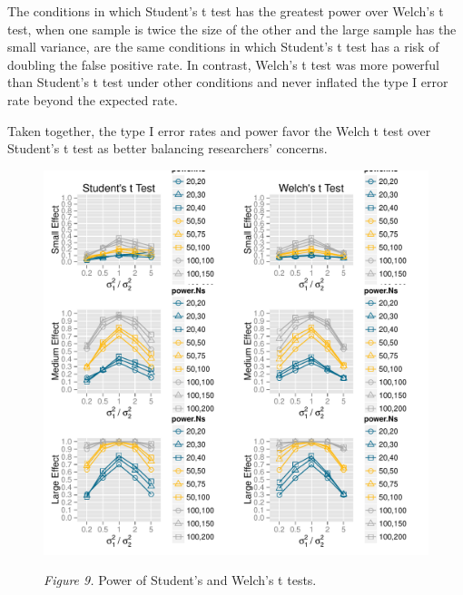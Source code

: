 \documentclass[man,a4paper,noextraspace,apacite]{apa6}\usepackage[]{graphicx}\usepackage[]{color}
\makeatletter
\def\maxwidth{ %
  \ifdim\Gin@nat@width>\linewidth
    \linewidth
  \else
    \Gin@nat@width
  \fi
}
\newenvironment{knitrout}{}{} %
\makeatother
\begin{document}
    The conditions in which Student's t test has the greatest power over Welch's t test, when one sample is twice the size of the other and the large sample has the small variance, are the same conditions in which Student's t test has a risk of doubling the false positive rate. In contrast, Welch's t test was more powerful than Student's t test under other conditions and never inflated the type I error rate beyond the expected rate.

    Taken together, the type I error rates and power favor the Welch t test over Student's t test as better balancing researchers' concerns.
\begin{figure}
\begin{knitrout}
\color{fgcolor}
\includegraphics[width=\maxwidth]{figure/plotPower} 

\end{knitrout}
\textit{Figure 9.} Power of Student's and Welch's t tests.
\end{figure}
\end{document}
